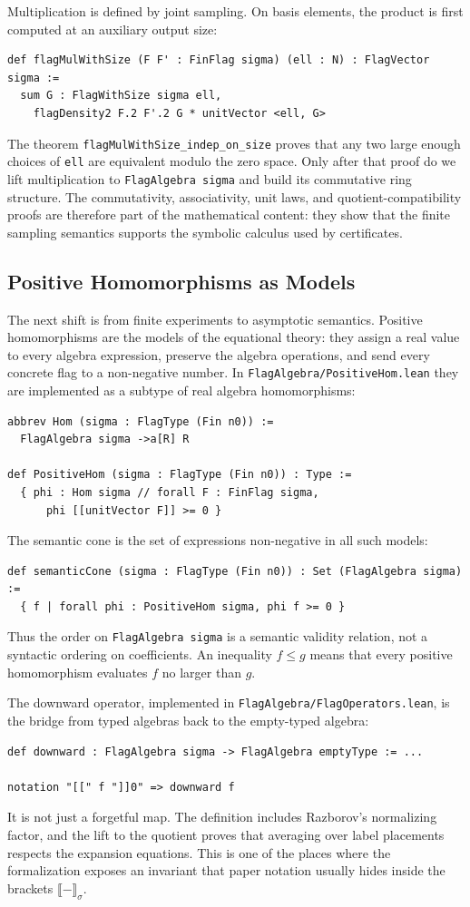 \documentclass{article}
\newcommand{\lean}[1]{\texttt{#1}}
\begin{document}
Multiplication is defined by joint sampling.  On basis elements, the product is
first computed at an auxiliary output size:
\begin{lstlisting}
def flagMulWithSize (F F' : FinFlag sigma) (ell : N) : FlagVector sigma :=
  sum G : FlagWithSize sigma ell,
    flagDensity2 F.2 F'.2 G * unitVector <ell, G>
\end{lstlisting}
The theorem \lean{flagMulWithSize\_indep\_on\_size} proves that any two large
enough choices of \lean{ell} are equivalent modulo the zero space.  Only after
that proof do we lift multiplication to \lean{FlagAlgebra sigma} and build its
commutative ring structure.  The commutativity, associativity, unit laws, and
quotient-compatibility proofs are therefore part of the mathematical content:
they show that the finite sampling semantics supports the symbolic calculus
used by certificates.

\subsection{Positive Homomorphisms as Models}

The next shift is from finite experiments to asymptotic semantics.  Positive
homomorphisms are the models of the equational theory: they assign a real value
to every algebra expression, preserve the algebra operations, and send every
concrete flag to a non-negative number.  In
\lean{FlagAlgebra/PositiveHom.lean} they are implemented as a subtype of real
algebra homomorphisms:
\begin{lstlisting}
abbrev Hom (sigma : FlagType (Fin n0)) :=
  FlagAlgebra sigma ->a[R] R

def PositiveHom (sigma : FlagType (Fin n0)) : Type :=
  { phi : Hom sigma // forall F : FinFlag sigma,
      phi [[unitVector F]] >= 0 }
\end{lstlisting}
The semantic cone is the set of expressions non-negative in all such models:
\begin{lstlisting}
def semanticCone (sigma : FlagType (Fin n0)) : Set (FlagAlgebra sigma) :=
  { f | forall phi : PositiveHom sigma, phi f >= 0 }
\end{lstlisting}
Thus the order on \lean{FlagAlgebra sigma} is a semantic validity relation, not
a syntactic ordering on coefficients.  An inequality $f\leq g$ means that
every positive homomorphism evaluates $f$ no larger than $g$.

The downward operator, implemented in \lean{FlagAlgebra/FlagOperators.lean},
is the bridge from typed algebras back to the empty-typed algebra:
\begin{lstlisting}
def downward : FlagAlgebra sigma -> FlagAlgebra emptyType := ...

notation "[[" f "]]0" => downward f
\end{lstlisting}
It is not just a forgetful map.  The definition includes Razborov's
normalizing factor, and the lift to the quotient proves that averaging over
label placements respects the expansion equations.  This is one of the places
where the formalization exposes an invariant that paper notation usually hides
inside the brackets $\llbracket-\rrbracket_\sigma$.
\end{document}

